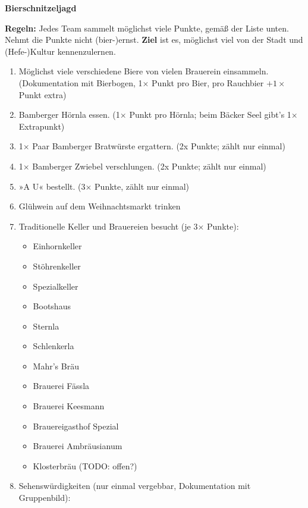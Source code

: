 \documentclass[a5paper,ngerman]{scrartcl}
\begin{document}
{%
\Huge
\begin{center}
\textbf{Bierschnitzeljagd}
\end{center}
}%

\textbf{Regeln:} Jedes Team sammelt möglichst viele Punkte, gemäß der Liste
unten. Nehmt die Punkte nicht (bier-)ernst. \textbf{Ziel} ist es, möglichst viel von der
Stadt und (Hefe-)Kultur kennenzulernen.

\begin{enumerate}
\setlength\itemsep{0em}
\item Möglichst viele verschiedene Biere von vielen Brauerein einsammeln. (Dokumentation mit Bierbogen, 1$\times$ Punkt pro Bier, pro Rauchbier $+1\times$ Punkt extra)
\item Bamberger Hörnla essen. (1$\times$ Punkt pro Hörnla; beim Bäcker Seel gibt's 1$\times$ Extrapunkt)
\item 1$\times$ Paar Bamberger Bratwürste ergattern. (2x Punkte; zählt nur einmal)
\item 1$\times$ Bamberger Zwiebel verschlungen. (2x Punkte; zählt nur einmal)
\item »A U« bestellt. (3$\times$ Punkte, zählt nur einmal)
\item Glühwein auf dem Weihnachtsmarkt trinken
\item Traditionelle Keller und Brauereien besucht (je 3$\times$ Punkte):
    \begin{multicols}{2}
    \begin{itemize}
    \item Einhornkeller
    \item Stöhrenkeller
    \item Spezialkeller
    \item Bootshaus
    \item Sternla
    \item Schlenkerla
    \item Mahr's Bräu
    \item Brauerei Fässla
    \item Brauerei Keesmann
    \item Brauereigasthof Spezial
    \item Brauerei Ambräusianum
    \item Klosterbräu (TODO: offen?)
    \end{itemize}
    \end{multicols}
\item Sehenswürdigkeiten (nur einmal vergebbar, Dokumentation mit Gruppenbild):
    \begin{multicols}{2}

\end{multicols}
\end{enumerate}
\end{document}
